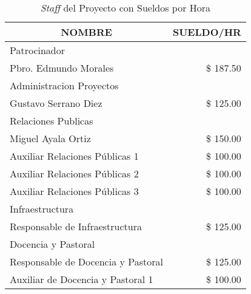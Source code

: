 \begin{table}
    \centering
    \caption{\emph{Staff} del Proyecto con Sueldos por Hora}
    \label{tbl:Proy:Personal:Costos}
    \footnotesize
    \begin{tabular}{l|r}
        \multicolumn{1}{c|}{NOMBRE}                     & \multicolumn{1}{c}{SUELDO/HR} \\
        \hline
        \hline
        \multicolumn{2}{l}{Patrocinador}                                                \\
        \hline
        \hspace{1em} Pbro. Edmundo Morales              & \$ 187.50                     \\
        \hline
        \multicolumn{2}{l}{Administracion Proyectos}                                    \\
        \hline
        \hspace{1em} Gustavo Serrano Diez               & \$ 125.00                     \\
        \hline
        \multicolumn{2}{l}{Relaciones Publicas}                                         \\
        \hline
        \hspace{1em} Miguel Ayala Ortiz                 & \$ 150.00                     \\
        \hspace{1em} Auxiliar Relaciones Públicas 1     & \$ 100.00                     \\
        \hspace{1em} Auxiliar Relaciones Públicas 2     & \$ 100.00                     \\
        \hspace{1em} Auxiliar Relaciones Públicas 3     & \$ 100.00                     \\
        \hline
        \multicolumn{2}{l}{Infraestructura}                                             \\
        \hline
        \hspace{1em} Responsable de Infraestructura     & \$ 125.00                     \\
        \hline
        \multicolumn{2}{l}{Docencia y Pastoral}                                         \\
        \hline
        \hspace{1em} Responsable de Docencia y Pastoral & \$ 125.00                     \\
        \hspace{1em} Auxiliar de Docencia y Pastoral 1  & \$ 100.00                     \\

\end{tabular}
\end{table}
